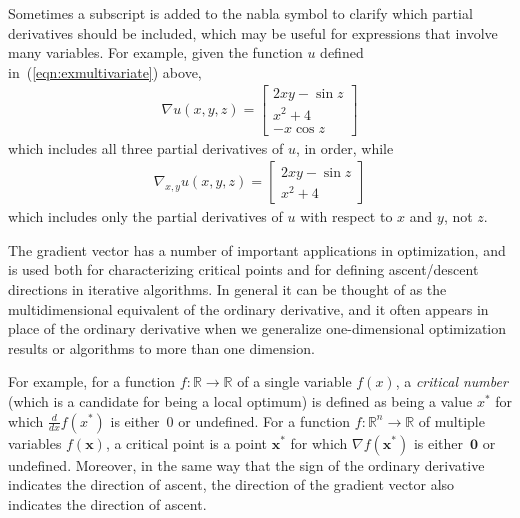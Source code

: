 \documentclass[11pt]{article}
\theoremstyle{definition} %
\begin{document}
Sometimes a subscript is added to the nabla symbol to clarify which partial derivatives should be included, which may be useful for expressions that involve many variables. For example, given the function $u$ defined in~(\ref{eqn:exmultivariate}) above,
\begin{align*}
	\nabla u(x,y,z) = \begin{bmatrix}
		2xy - \sin z \\
		x^2 + 4 \\
		-x \cos z
	\end{bmatrix}
\end{align*}
which includes all three partial derivatives of $u$, in order, while
\begin{align*}
	\nabla_{x,y} u(x,y,z) = \begin{bmatrix}
		2xy - \sin z \\
		x^2 + 4
	\end{bmatrix}
\end{align*}
which includes only the partial derivatives of $u$ with respect to $x$ and $y$, not $z$.

The gradient vector has a number of important applications in optimization, and is used both for characterizing critical points and for defining ascent/descent directions in iterative algorithms. In general it can be thought of as the multidimensional equivalent of the ordinary derivative, and it often appears in place of the ordinary derivative when we generalize one-dimensional optimization results or algorithms to more than one dimension.

For example, for a function $f : \mathbb{R} \to \mathbb{R}$ of a single variable $f(x)$, a \textit{critical number} (which is a candidate for being a local optimum) is defined as being a value $x^*$ for which $\frac{d}{dx} f(x^*)$ is either~$0$ or undefined. For a function $f : \mathbb{R}^n \to \mathbb{R}$ of multiple variables $f(\mathbf{x})$, a critical point is a point $\mathbf{x^{\boldsymbol{*}}}$ for which $\nabla f(\mathbf{x^{\boldsymbol{*}}})$ is either~$\mathbf{0}$ or undefined. Moreover, in the same way that the sign of the ordinary derivative indicates the direction of ascent, the direction of the gradient vector also indicates the direction of ascent.
\end{document}
